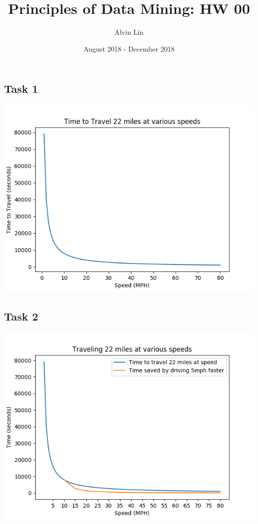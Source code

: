 \documentclass{math}
\title{Principles of Data Mining: HW 00}
\author{Alvin Lin}
\date{August 2018 - December 2018}
\begin{document}
\maketitle

\subsection*{Task 1}
\begin{center}
  \includegraphics[width=15cm]{assets/hw_00_task1.png}
\end{center}

\subsection*{Task 2}
\begin{center}
  \includegraphics[width=15cm]{assets/hw_00_task2.png}
\end{center}
\end{document}
